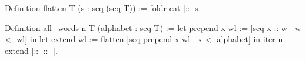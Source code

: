 
\begin{Answer}[ref=ex:flatten]

\begin{coq}{}{}
Definition flatten T (s : seq (seq T)) := foldr cat [::] s.
\end{coq}

\end{Answer}

\begin{Answer}[ref=ex:allwords]

\begin{coq}{}{}
Definition all_words n T (alphabet : seq T) :=
  let prepend x wl := [seq x :: w | w <- wl] in
  let extend wl := flatten [seq prepend x wl | x <- alphabet] in
  iter n extend [:: [::] ].
\end{coq}

\end{Answer}





